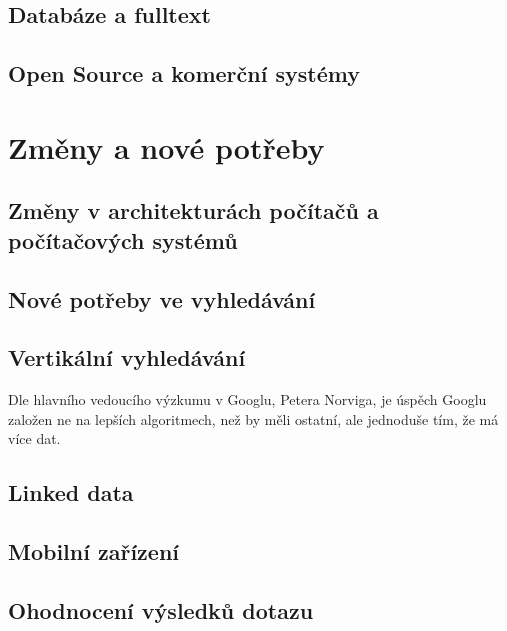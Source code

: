 \documentclass[11pt]{article}
\begin{document}
\subsection{Databáze a fulltext}
\subsection{Open Source a komerční systémy}

\section{Změny a nové potřeby}
\subsection{Změny v architekturách počítačů a počítačových systémů}


\subsection{Nové potřeby ve vyhledávání}
\subsection{Vertikální vyhledávání}
Dle hlavního vedoucího výzkumu v Googlu, Petera Norviga, je úspěch Googlu
založen ne na lepších algoritmech, než by měli ostatní, ale jednoduše tím, že
má více dat.
\subsection{Linked data}
\subsection{Mobilní zařízení}

\subsection{Ohodnocení výsledků dotazu}
\end{document}
